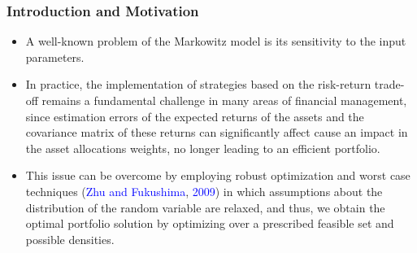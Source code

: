 \documentclass[pdf,9pt,xcolor=dvipsnames,hide notes]{beamer}
\begin{document}
\begin{frame}[label=frame1d]
	\frametitle{Introduction and Motivation}
	
	\begin{itemize}
		\justifying
		
		
		\vspace{0.3cm}
		
		\item A well-known problem of
		the Markowitz model is its sensitivity to the input parameters. 
		
		\vspace{0.3cm}
		
		
		\item In practice, the implementation of strategies based on the risk-return trade-off remains a fundamental challenge in many areas of financial management, since estimation errors of the expected returns of the assets and the covariance
		matrix of these returns can significantly affect cause an impact in the asset allocations weights, no
		longer leading to an efficient portfolio.
		
		
	
		\vspace{0.3cm}
		
	\item This issue can be overcome by employing robust optimization and
	worst case techniques (\textcolor{blue}{Zhu and Fukushima}, \textcolor{blue}{2009}) in which assumptions about the
	distribution of the random variable are relaxed, and thus, we obtain the
	optimal portfolio solution by optimizing over a prescribed feasible set and
	possible densities.
		
	\end{itemize}
	
	
\end{frame}
\end{document}
